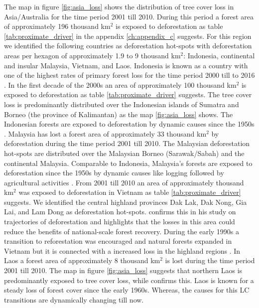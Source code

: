 			The map in figure \ref{fig:asia_loss} shows the distribution of tree cover loss in Asia/Australia for the time period 2001 till 2010. During this period a forest area of approximately 196 thousand km$^2$ is exposed to deforestation as table \ref{tab:proximate_driver} in the appendix \ref{ch:appendix_c} suggests. For this region we identified the following countries as deforestation hot-spots with deforestation areas per hexagon of approximately 1.9 to 9 thousand km$^2$: Indonesia, continental and insular Malaysia, Vietnam, and Laos. Indonesia is known as a country with one of the highest rates of primary forest loss for the time period 2000 till to 2016 \citep{Austin2019}. In the first decade of the 2000s an area of approximately 100 thousand km$^2$ is exposed to deforestation as table \ref{tab:proximate_driver} suggests. The tree cover loss is predominantly distributed over the Indonesian islands of Sumatra and Borneo (the province of Kalimantan) as the map \ref{fig:asia_loss} shows. The Indonesian forests are exposed to deforestation by dynamic causes since the 1950s \citep{Nawir2007}. Malaysia has lost a forest area of approximately 33 thousand km$^2$ by deforestation during the time period 2001 till 2010. The  Malaysian deforestation hot-spots are distributed over the Malaysian Borneo (Sarawak/Sabah) and the continental Malaysia. Comparable to Indonesia, Malaysia's forests are exposed to deforestation since the 1950s by dynamic causes like logging followed by agricultural activities \citep{Kummer1994}. From 2001 till 2010 an area of approximately thousand km$^2$ was exposed to deforestation in Vietnam as table \ref{tab:proximate_driver} suggests. We identified the central highland provinces Dak Lak, Dak Nong, Gia Lai, and Lam Dong as deforestation hot-spots. \citet{Meyfroidt2013} confirms this in his study on trajectories of deforestation and highlights that the losses in this area could reduce the benefits of national-scale forest recovery. During the early 1990s a transition to reforestation was encouraged and natural forests expanded in Vietnam but it is connected with a increased loss in the highland regions \citep{Meyfroidt2013,Chazdon2008}. In Laos a forest area of approximately 8 thousand km$^2$ is lost during the time period 2001 till 2010. The map in figure \ref{fig:asia_loss} suggests that northern Laos is predominantly exposed to tree cover loss, while \citet{Hirsch2000} confirms this. Laos is known for a steady loss of forest cover since the early 1960s. Whereas, the causes for this \ac{LC} transitions are dynamically changing till now.
